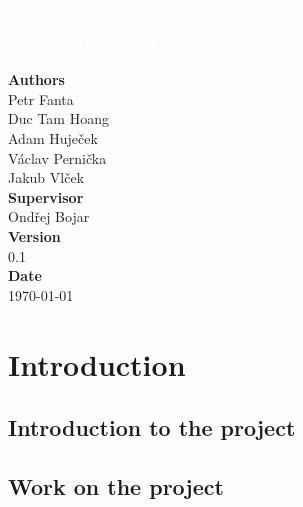 \documentclass[12pt,a4paper]{report}
\begin{document}
\begin{titlepage}
\BgThispage

\vspace*{0.3\textheight}
\noindent
\textcolor{white}{\bigsf TextAn}

\vspace*{1cm}
\noindent
\textcolor{white}{\Huge\textbf{\textsf{Developer Documentation}}}

\vspace*{2cm}\par
\noindent
\begin{minipage}{0.35\linewidth}
\textbf{Authors} \\
Petr Fanta \\
Duc Tam Hoang \\
Adam Huječek \\
Václav Pernička \\
Jakub Vlček\vspace{40pt} \\
\textbf{Supervisor} \\
Ondřej Bojar\vspace{40pt} \\
\textbf{Version} \\
0.1\vspace{40pt} \\
\textbf{Date} \\
\today \\
\end{minipage}


\end{titlepage}
\restoregeometry

\tableofcontents



\chapter{Introduction}

\section{Introduction to the project}
\section{Work on the project}
\end{document}
